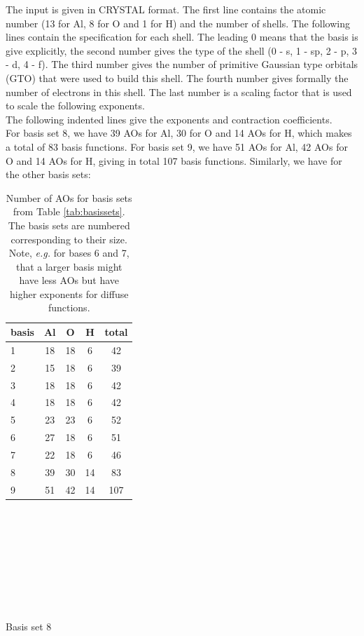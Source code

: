 \documentclass[11pt,DIV=13,BCOR=5mm,a4paper,headinclude]{scrbook}
\begin{document}
The input is given in CRYSTAL format.
The first line contains the atomic number (13 for Al, 8 for O and 1 for H) and the number of shells.
The following lines contain the specification for each shell.
The leading 0 means that the basis is give explicitly, the second number gives the type of the shell (0 - s, 1 - sp, 2 - p, 3 - d, 4 - f).
The third number gives the number of primitive Gaussian type orbitals (GTO) that were used to build this shell.
The fourth number gives formally the number of electrons in this shell.
The last number is a scaling factor that is used to scale the following exponents.
\\
The following indented lines give the exponents and contraction coefficients.\\
For basis set 8, we have 39 AOs for Al, 30 for O and 14 AOs for H, which makes a total of 83 basis functions.
For basis set 9, we have 51 AOs for Al, 42 AOs for O and 14 AOs for H, giving in total 107 basis functions.
Similarly, we have for the other basis sets:
\begin{table}
 \centering
   \caption{Number of AOs for basis sets from Table \ref{tab:basissets}.
   The basis sets are numbered corresponding to their size.
   Note, \textit{e.g.} for bases 6 and 7, that a larger basis might have less AOs but have higher exponents for diffuse functions.}
  \begin{tabular}{l|cccc}
  \toprule
basis& Al & O & H & total\\\midrule
1 &18 &18 &6 &42 \\ 
2 &15 &18 &6 &39 \\ 
3 &18 &18 &6 &42 \\ 
4 &18 &18 &6 &42 \\ 
5 &23 &23 &6 &52 \\ 
6 &27 &18 &6 &51 \\ 
7 &22 &18 &6 &46 \\ 
8 &39 &30 &14 &83 \\ 
9 &51 &42 &14 &107 \\\bottomrule
  \end{tabular}
\label{tab:number-of-AOs}
\end{table}
\\\\\\\\\\\\\\\\
Basis set 8
\end{document}
